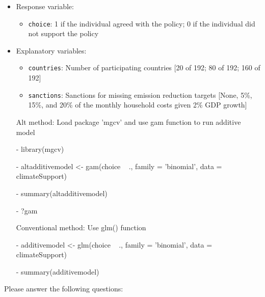 \documentclass[12pt,letterpaper]{article}
\begin{document}
\begin{itemize}
	\item
	Response variable: 
	\begin{itemize}
		\item \texttt{choice}: 1 if the individual agreed with the policy; 0 if the individual did not support the policy
	\end{itemize}
	\item
	Explanatory variables: 
	\begin{itemize}
		\item
		\texttt{countries}: Number of participating countries [20 of 192; 80 of 192; 160 of 192]
		\item
		\texttt{sanctions}: Sanctions for missing emission reduction targets [None, 5\%, 15\%, and 20\% of the monthly household costs given 2\% GDP growth]
		
	\end{itemize}
\vspace{1cm}
Alt method: Load package 'mgcv' and use gam function to run additive model

	- library(mgcv)
	
	- altadditivemodel <- gam(choice ~ ., family = 'binomial', data = climateSupport)
	
	- summary(altadditivemodel)
	
	- ?gam
	

Conventional method: Use glm() function

	- additivemodel <- glm(choice ~ ., family = 'binomial', data = climateSupport)
	
	- summary(additivemodel)
	
\end{itemize}

\newpage
\noindent Please answer the following questions:
\end{document}
